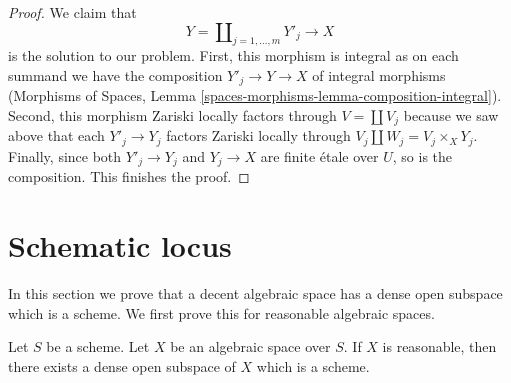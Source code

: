 \begin{proof}
\medskip\noindent
We claim that
$$
Y = \coprod\nolimits_{j = 1, \ldots, m} Y'_j \longrightarrow X
$$
is the solution to our problem. First, this morphism is integral
as on each summand we have the composition $Y'_j \to Y \to X$
of integral morphisms (Morphisms of Spaces, Lemma
\ref{spaces-morphisms-lemma-composition-integral}). Second, this
morphism Zariski locally factors through $V = \coprod V_j$ because
we saw above that each $Y'_j \to Y_j$ factors Zariski locally through
$V_j \amalg W_j = V_j \times_X Y_j$. Finally, since both
$Y'_j \to Y_j$ and $Y_j \to X$ are finite \'etale over
$U$, so is the composition. This finishes the proof.
\end{proof}



















\section{Schematic locus}
\label{section-schematic}

\noindent
In this section we prove that a decent algebraic space has a dense open
subspace which is a scheme. We first prove this for reasonable algebraic
spaces.


\begin{proposition}
\label{proposition-reasonable-open-dense-scheme}
Let $S$ be a scheme. Let $X$ be an algebraic space over $S$.
If $X$ is reasonable, then there exists a dense open subspace
of $X$ which is a scheme.
\end{proposition}

